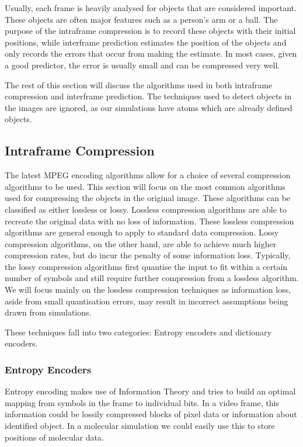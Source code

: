 \documentclass[a4paper,11pt]{report}
\begin{document}
Usually, each frame is heavily analysed for objects that are considered important. These objects are often major features such as a person's arm or a ball. The purpose of the intraframe compression is to record these objects with their initial positions, while interframe prediction estimates the position of the objects and only records the errors that occur from making the estimate. In most cases, given a good predictor, the error is usually small and can be compressed very well.

The rest of this section will discuss the algorithms used in both intraframe compression and interframe prediction. The techniques used to detect objects in the images are ignored, as our simulations have atoms which are already defined objects.

\subsection{Intraframe Compression}
\label{back_intra}

The latest MPEG encoding algorithms allow for a choice of several compression algorithms to be used\cite{gall1991mvc}. This section will focus on the most common algorithms used for compressing the objects in the original image. These algorithms can be classified as either lossless or lossy. Lossless compression algorithms are able to recreate the original data with no loss of information. These lossless compression algorithms are general enough to apply to standard data compression. Lossy compression algorithms, on the other hand, are able to achieve much higher compression rates, but do incur the penalty of some information loss. Typically, the lossy compression algorithms first quantise the input to fit within a certain number of symbols and still require further compression from a lossless algorithm. We will focus mainly on the lossless compression techniques as information loss, aside from small quantisation errors, may result in incorrect assumptions being drawn from simulations.  

These techniques fall into two categories: Entropy encoders and dictionary encoders. 

\subsubsection{Entropy Encoders}

Entropy encoding makes use of Information Theory and tries to build an optimal mapping from symbols in the frame to individual bits. In a video frame, this information could be lossily compressed blocks of pixel data or information about identified object. In a molecular simulation we could easily use this to store positions of molecular data.
\end{document}
